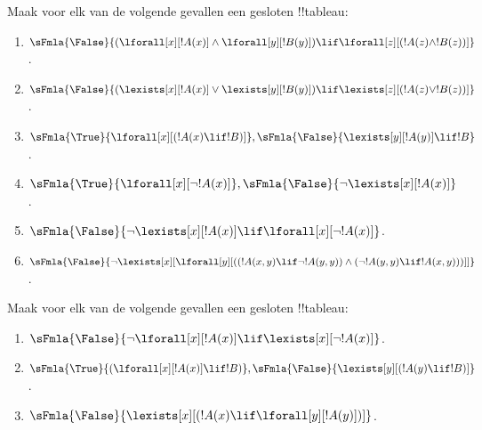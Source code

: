 \documentclass[../../../include/open-logic-section]{subfiles}
\begin{document}
\begin{prob}
Maak voor elk van de volgende gevallen een gesloten !!{tableau}:
\begin{enumerate}
\item $\sFmla{\False}{(\lforall[x][!A(x)] \land \lforall[y][!B(y)])
\lif \lforall[z][(!A(z) \land !B(z))]}$.
\item $\sFmla{\False}{(\lexists[x][!A(x)] \lor \lexists[y][!B(y)])
\lif \lexists[z][(!A(z) \lor !B(z))]}$.
\item $\sFmla{\True}{\lforall[x][(!A(x) \lif !B)]},
\sFmla{\False}{\lexists[y][!A(y)] \lif !B}$.
\item $\sFmla{\True}{\lforall[x][\lnot !A(x)]},
\sFmla{\False}{\lnot\lexists[x][!A(x)]}$.
\item $\sFmla{\False}{\lnot\lexists[x][!A(x)] \lif \lforall[x][\lnot
!A(x)]}$.
\item $\sFmla{\False}{\lnot\lexists[x][\lforall[y][((!A(x,y) \lif
\lnot !A(y,y)) \land (\lnot !A(y,y) \lif !A(x,y)))]]}$.
\end{enumerate}
\end{prob}

\begin{prob}
Maak voor elk van de volgende gevallen een gesloten !!{tableau}:
\begin{enumerate}
\item $\sFmla{\False}{\lnot\lforall[x][!A(x)] \lif \lexists[x][\lnot!A(x)]}$.
\item $\sFmla{\True}{(\lforall[x][!A(x)] \lif !B)}, \sFmla{\False}{\lexists[y][(!A(y) \lif !B)]}$.
\item $\sFmla{\False}{\lexists[x][(!A(x) \lif \lforall[y][!A(y)])]}$.
\end{enumerate}
\end{prob}
\end{document}
